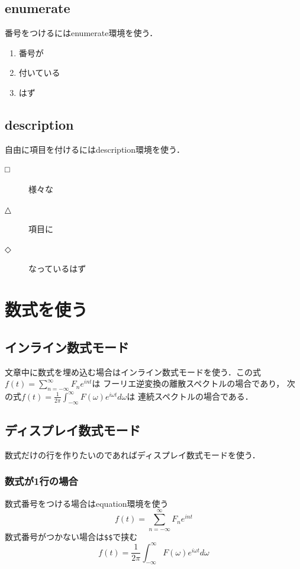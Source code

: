 \documentclass[a4j,titlepage,dvipdfmx]{jsarticle}   %
\begin{document}
  \subsection{enumerate}
  番号をつけるにはenumerate環境を使う．
  \begin{enumerate}
      \item 番号が
      \item 付いている
      \item はず
  \end{enumerate}

  \subsection{description}
  自由に項目を付けるにはdescription環境を使う．
  \begin{description}
      \item[□] 様々な
      \item[△] 項目に
      \item[◇] なっているはず
  \end{description}
  \section{数式を使う}
  \subsection{インライン数式モード}
  文章中に数式を埋め込む場合はインライン数式モードを使う．この式$f(t) = \sum_{n=-\infty}^{\infty} F_n e^{int}$は
  フーリエ逆変換の離散スペクトルの場合であり，
  次の式$f(t) = \frac{1}{2\pi}\int_{-\infty}^{\infty}F(\omega)e^{i\omega t} d\omega$は
  連続スペクトルの場合である．

  \subsection{ディスプレイ数式モード}
  数式だけの行を作りたいのであればディスプレイ数式モードを使う．

  \subsubsection{数式が1行の場合}
  数式番号をつける場合はequation環境を使う
  \begin{equation} %
    f(t) = \sum_{n=-\infty}^{\infty} F_n e^{int}
  \end{equation}
  数式番号がつかない場合は\verb|$$|で挟む
  $$ %
  	f(t) = \frac{1}{2\pi}\int_{-\infty}^{\infty}F(\omega)e^{i\omega t} d\omega
  $$
\end{document}

